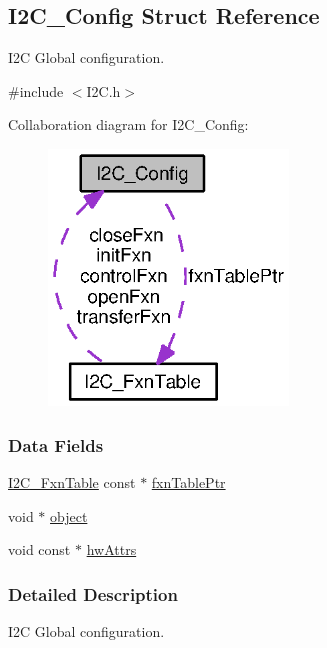 \subsection{I2\+C\+\_\+\+Config Struct Reference}
\label{struct_i2_c___config}


I2\+C Global configuration.  




{\ttfamily \#include $<$I2\+C.\+h$>$}



Collaboration diagram for I2\+C\+\_\+\+Config\+:
\nopagebreak
\begin{figure}[H]
\begin{center}
\leavevmode
\includegraphics[width=181pt]{struct_i2_c___config__coll__graph}
\end{center}
\end{figure}
\subsubsection*{Data Fields}
\begin{DoxyCompactItemize}
\item 
\hyperlink{struct_i2_c___fxn_table}{I2\+C\+\_\+\+Fxn\+Table} const $\ast$ \hyperlink{struct_i2_c___config_a225800ca2923178397645d520bc6a0c1}{fxn\+Table\+Ptr}
\item 
void $\ast$ \hyperlink{struct_i2_c___config_abeb7af699744bd43dc1fc5019073fd2c}{object}
\item 
void const $\ast$ \hyperlink{struct_i2_c___config_a1c623e253c0d5f896ad8037635f0c719}{hw\+Attrs}
\end{DoxyCompactItemize}


\subsubsection{Detailed Description}
I2\+C Global configuration. 

